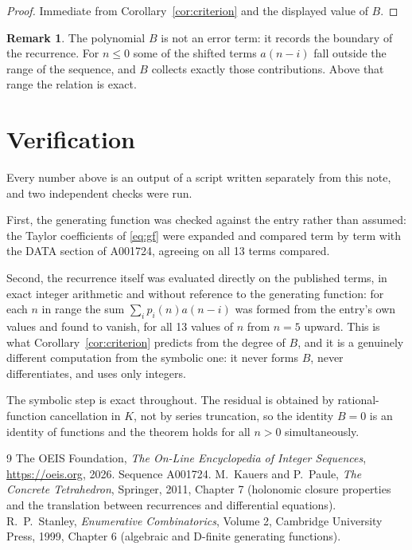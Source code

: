 \documentclass[11pt,a4paper]{article}
\theoremstyle{plain}
\theoremstyle{definition}
\newtheorem{remark}[theorem]{Remark}
\begin{document}
\begin{proof}
Immediate from Corollary~\ref{cor:criterion} and the displayed value of $B$.
\end{proof}

\begin{remark}
The polynomial $B$ is not an error term: it records the boundary of the recurrence. For
$n\le0$ some of the shifted terms $a(n-i)$ fall outside the range of the sequence,
and $B$ collects exactly those contributions. Above that range the relation is exact.
\end{remark}

\section{Verification}

Every number above is an output of a script written separately from this note, and two
independent checks were run.

First, the generating function was checked against the entry rather than assumed: the
Taylor coefficients of \eqref{eq:gf} were expanded and compared term by term with the DATA
section of A001724, agreeing on all 13 terms compared.

Second, the recurrence itself was evaluated directly on the published terms, in exact
integer arithmetic and without reference to the generating function: for each $n$ in range
the sum $\sum_{i}p_{i}(n)a(n-i)$ was formed from the entry's own values and found to
vanish, for all 13 values of $n$ from $n=5$ upward. This is what
Corollary~\ref{cor:criterion} predicts from the degree of $B$, and it is a genuinely
different computation from the symbolic one: it never forms $B$, never differentiates, and
uses only integers.

The symbolic step is exact throughout. The residual is obtained by rational-function
cancellation in $K$, not by series truncation, so the identity $B=0$ is an
identity of functions and the theorem holds for all $n>0$ simultaneously.

\begin{thebibliography}{9}
 The OEIS Foundation, \emph{The On-Line Encyclopedia of Integer Sequences},
\url{https://oeis.org}, 2026. Sequence A001724.
 M.~Kauers and P.~Paule, \emph{The Concrete Tetrahedron}, Springer, 2011,
Chapter 7 (holonomic closure properties and the translation between recurrences and
differential equations).
 R.~P.~Stanley, \emph{Enumerative Combinatorics}, Volume 2, Cambridge
University Press, 1999, Chapter 6 (algebraic and D-finite generating functions).
\end{thebibliography}
\end{document}
